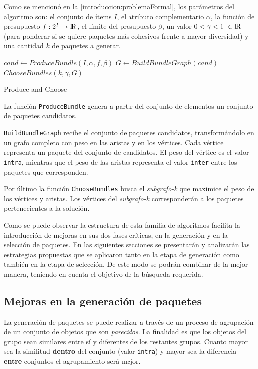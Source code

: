 Como se mencionó en la \autoref{introduccion:problemaFormal}, los parámetros del algoritmo son: el conjunto de ítems $I$, el atributo complementario $\alpha$, la función de presupuesto $f: 2^{I} \rightarrow \rm I \!R$, el límite del presupuesto $\beta$, un valor $0 < \gamma < 1\ \in \rm I \!R$ (para ponderar si se quiere paquetes más cohesivos frente a mayor diversidad) y una cantidad $k$ de paquetes a generar. 

\begin{center}
	\begin{algorithm}[H]
	\DontPrintSemicolon
	\SetAlgoLined
		$cand \leftarrow ProduceBundle(I,\alpha,f,\beta)$\;
		$G \leftarrow BuildBundleGraph(cand)$\;
		\Return $ChooseBundles(k,\gamma,G)$\;
	\caption{Produce-and-Choose}\label{alg:PAC}
	\end{algorithm}
\end{center}

La función \texttt{ProduceBundle} genera a partir del conjunto de elementos un conjunto de paquetes candidatos.

\texttt{BuildBundleGraph} recibe el conjunto de paquetes candidatos, transformándolo en un grafo completo con peso en las aristas y en los vértices. Cada vértice representa un paquete del conjunto de candidatos. El peso del vértice es el valor \texttt{intra}, mientras que el peso de las aristas representa el valor \texttt{inter} entre los paquetes que corresponden. 

Por último la función \texttt{ChooseBundles} busca el \textit{subgrafo-k} que maximice el peso de los vértices y aristas. Los vértices del \textit{subgrafo-k} corresponderán a los paquetes pertenecientes a la solución.

Como se puede observar la estructura de esta familia de algoritmos facilita la introducción de mejoras en sus dos fases críticas, en la generación y en la selección de paquetes. En las siguientes secciones se presentarán y analizarán las estrategias propuestas que se aplicaron tanto en la etapa de generación como también en la etapa de selección. De este modo se podrán combinar de la mejor manera, teniendo en cuenta el objetivo de la búsqueda requerida.

\subsection{Mejoras en la generación de paquetes}
La generación de paquetes se puede realizar a través de un proceso de agrupación de un conjunto de objetos que son \textit{parecidos}. La finalidad es que los objetos del grupo sean similares entre sí y diferentes de los restantes grupos. Cuanto mayor sea la similitud \textbf{dentro} del conjunto (valor \texttt{intra}) y mayor sea la diferencia \textbf{entre} conjuntos el agrupamiento será mejor.

